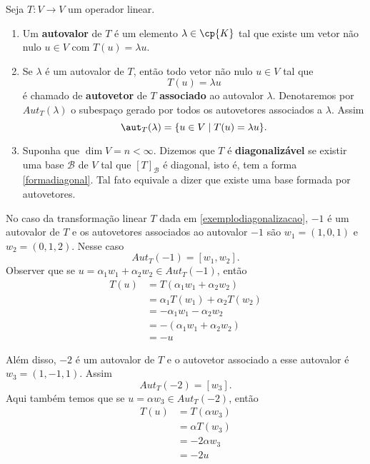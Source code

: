 \begin{definicao}
    Seja $T : V \to V$ um operador linear.
    \begin{enumerate}[label={\roman*})]
        \item Um \textbf{autovalor} de $T$ é um elemento $\lambda \in \cp{K}$ tal que existe um vetor não nulo $u \in V$ com $T(u) = \lambda u$.
        \item Se $\lambda$ é um autovalor de $T$, então todo vetor não nulo $u \in V$ tal que
        \[
            T(u) = \lambda u
        \]
        é chamado de \textbf{autovetor} de $T$ \textbf{associado} ao autovalor $\lambda$. Denotaremos por $Aut_T(\lambda)$ o subespaço gerado por todos os autovetores associados a $\lambda$. Assim
        \[
            \aut_T(\lambda) = \{u \in V \mid T(u) = \lambda u\}.
        \]
        \item Suponha que $\dim V = n < \infty$. Dizemos que $T$ é \textbf{diagonalizável} se existir uma base $\mathcal{B}$ de $V$ tal que $[T]_\mathcal{B}$ é diagonal, isto é, tem a forma \eqref{formadiagonal}. Tal fato equivale a dizer que existe uma base formada por autovetores.
    \end{enumerate}
\end{definicao}

\begin{exemplo}
    No caso da transformação linear $T$ dada em \eqref{exemplodiagonalizacao}, $-1$ é um autovalor de $T$ e os autovetores associados ao autovalor $-1$ são $w_1 = (1, 0, 1)$ e $w_2 = (0, 1, 2)$. Nesse caso
    \[
        Aut_T(-1) = [w_1, w_2].
    \]
    Observer que se $u = \alpha_1w_1 + \alpha_2w_2 \in Aut_T(-1)$, então
    \begin{align*}
        T(u) &= T(\alpha_1w_1 + \alpha_2w_2) \\ &= \alpha_1T(w_1) + \alpha_2T(w_2) \\ &= -\alpha_1w_1 - \alpha_2w_2 \\ &= -(\alpha_1w_1 + \alpha_2w_2) \\ &= -u
    \end{align*}

    Além disso, $-2$ é um autovalor de $T$ e o autovetor associado a esse autovalor é $w_3 = (1, -1, 1)$. Assim
    \[
        Aut_T(-2) = [w_3].
    \]
    Aqui também temos que se $u = \alpha w_3 \in Aut_T(-2)$, então
    \begin{align*}
        T(u) &= T(\alpha w_3) \\ &= \alpha T(w_3) \\ &= -2\alpha w_3 \\ &= -2u
    \end{align*}
\end{exemplo}

